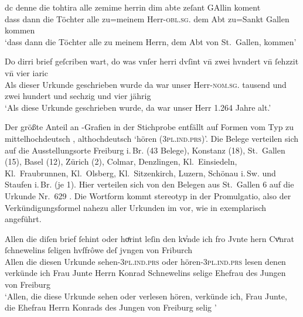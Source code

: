 \begin{exe}
\ex \label{ex:herrin}
	\begin{xlist}
	\ex\label{ex:stg_herrin}
		\setlength{\glossglue}{5pt plus 2pt minus 1pt}
		\gll dc denne die tohtira alle zemime herrin dim abte zeſant GAllin
				koment\\
			dass dann die Töchter alle zu=meinem Herr-\textsc{obl.sg.\MascM}
				dem Abt zu=Sankt Gallen kommen \\
		\trans `dass dann die Töchter alle zu meinem Herrn, dem Abt von
			St.~Gallen, kommen'
			\parencites(Nr.~628, St.~Gallen, 1284)[56,34]{cao2}

	\ex\label{ex:col_herri}
		\gll Do dirri brief geſcriben wart, do was vnſer herri dvſint vn̄ zwei
				hvndert vn̄ ſehzzit vn̄ vier iaric \\
			Als dieser Urkunde geschrieben wurde da war unser
				Herr-\textsc{nom.sg.\MascM} tausend und zwei hundert und
				sechzig und vier jährig \\
		\trans `Als diese Urkunde geschrieben wurde, da war unser Herr
			1.264 Jahre alt.'
			\parencites(Nr.~N~53, Colmar, 1264)[37,15]{cao5}
\end{xlist}
\end{exe}

Der größte Anteil an -Grafien in der Stichprobe entfällt auf Formen vom
Typ  zu mittelhochdeutsch , althochdeutsch
 `hören (\textsc{3pl.ind.prs})'. Die Belege verteilen sich auf die
Ausstellungsorte Freiburg i.\,Br. (43 Belege), Konstanz (18), St.~Gallen (15),
Basel (12), Zürich (2), Colmar, Denzlingen, Kl.~Einsiedeln, Kl.~Fraubrunnen,
Kl.~Olsberg, Kl.~Sitzenkirch, Luzern, Schönau i.\,Sw. und Staufen i.\,Br. (je
1). Hier verteilen sich von den Belegen aus St.~Gallen 6 auf die Urkunde
Nr.~629 \autocites(St.~Gallen, 1284)[57,9--57,35]{cao2}. Die Wortform
 kommt stereotyp in der Promulgatio, also der Verkündigungsformel
nahezu aller Urkunden im \CAO{} vor, wie in  exemplarisch
angeführt.

\begin{exe}
\ex\label{ex:fribr_hoerint}
	\gll Allen die diſen brief ſehint oder hoͤrint leſin den kv̓nde ich fro
			Jvnte hern Cvͦnrat ſchnewelins ſeligen hvſfrôwe deſ jvngen von
			Friburch \\
		Allen die diesen Urkunde sehen-\textsc{3pl.ind.prs} oder
			hören-\textsc{3pl.ind.prs} lesen denen verkünde ich Frau Junte Herrn
			Konrad Schnewelins selige Ehefrau des Jungen von Freiburg \\
	\trans `Allen, die diese Urkunde sehen oder verlesen hören, verkünde
		ich, Frau Junte, die Ehefrau Herrn Konrads des Jungen von Freiburg
		selig \textelp{}'
		\parencites(Nr.~328, Freiburg i.\,Br., 1277)[314,33--34]{cao1}
\end{exe}

